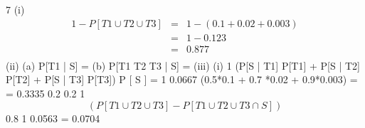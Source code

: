 \documentclass[a4paper,12pt]{article}
\begin{document}
7
(i) 
\begin{eqnarray*} 
1 − P[T1 \cup T2 \cup T3] &=& 1 − (0.1 + 0.02 + 0.003) \\ &=& 1 − 0.123 \\ &=& 0.877\\ 
\end{eqnarray*}
(ii) (a)
P[T1 | S] =
(b)
P[T1 \cup T2 \cup T3 | S] =
(iii)
(i)
1
(P[S | T1] P[T1] + P[S | T2] P[T2] + P[S | T3] P[T3])
P [ S ]
= 1
0.0667
(0.5*0.1 + 0.7 *0.02 + 0.9*0.003) =
= 0.3335
0.2
0.2
1
\[(P[T1 \cup T 2 \cup T 3] − P [{ T 1 \cup T 2 \cup T 3} \cap S ])\]
0.8
1
0.0563
= 0.0704
\end{document}
